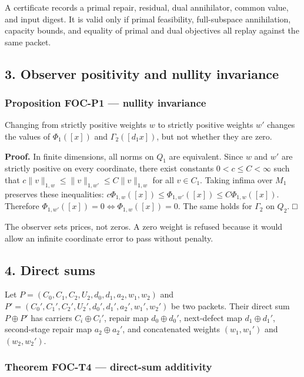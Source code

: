 \documentclass[
  11pt,
]{article}
\begin{document}
A certificate records a primal repair, residual, dual annihilator, common value, and input digest. It is valid only if primal feasibility, full-subspace annihilation, capacity bounds, and equality of primal and dual objectives all replay against the same packet.

\subsection{3. Observer positivity and nullity invariance}\label{observer-positivity-and-nullity-invariance}

\subsubsection{Proposition FOC-P1 --- nullity invariance}\label{proposition-foc-p1-nullity-invariance}

Changing from strictly positive weights \(w\) to strictly positive weights \(w'\) changes the values of \(\Phi_1([x])\) and \(\Gamma_2([d_1 x])\), but not whether they are zero.

\textbf{Proof.} In finite dimensions, all norms on \(Q_1\) are equivalent. Since \(w\) and \(w'\) are strictly positive on every coordinate, there exist constants \(0<c\le C<\infty\) such that \(c\|v\|_{1,w}\le\|v\|_{1,w'}\le C\|v\|_{1,w}\) for all \(v\in C_1\). Taking infima over \(M_1\) preserves these inequalities: \(c\Phi_{1,w}([x])\le\Phi_{1,w'}([x])\le C\Phi_{1,w}([x])\). Therefore \(\Phi_{1,w'}([x])=0\iff\Phi_{1,w}([x])=0\). The same holds for \(\Gamma_2\) on \(Q_2\). □

The observer sets prices, not zeros. A zero weight is refused because it would allow an infinite coordinate error to pass without penalty.

\subsection{4. Direct sums}\label{direct-sums}

Let \(P=(C_0,C_1,C_2,U_2,d_0,d_1,a_2,w_1,w_2)\) and \(P'=(C_0',C_1',C_2',U_2',d_0',d_1',a_2',w_1',w_2')\) be two packets. Their direct sum \(P\oplus P'\) has carriers \(C_i\oplus C_i'\), repair map \(d_0\oplus d_0'\), next-defect map \(d_1\oplus d_1'\), second-stage repair map \(a_2\oplus a_2'\), and concatenated weights \((w_1,w_1')\) and \((w_2,w_2')\).

\subsubsection{Theorem FOC-T4 --- direct-sum additivity}\label{theorem-foc-t4-direct-sum-additivity}
\end{document}
